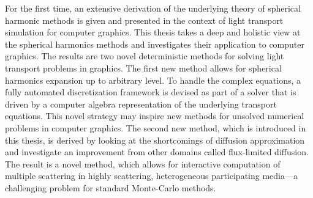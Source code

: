 For the first time, an extensive derivation of the underlying theory of spherical harmonic methods is given and presented in the context of light transport simulation for computer graphics. This thesis takes a deep and holistic view at the spherical harmonics methods and investigates their application to computer graphics. The results are two novel deterministic methods for solving light transport problems in graphics. The first new method allows for spherical harmonics expansion up to arbitrary level. To handle the complex equations, a fully automated discretization framework is devised as part of a solver that is driven by a computer algebra representation of the underlying transport equations. This novel strategy may inspire new methods for unsolved numerical problems in computer graphics. The second new method, which is introduced in this thesis, is derived by looking at the shortcomings of diffusion approximation and investigate an improvement from other domains called flux-limited diffusion. The result is a novel method, which allows for interactive computation of multiple scattering in highly scattering, heterogeneous participating media---a challenging problem for standard Monte-Carlo methods.